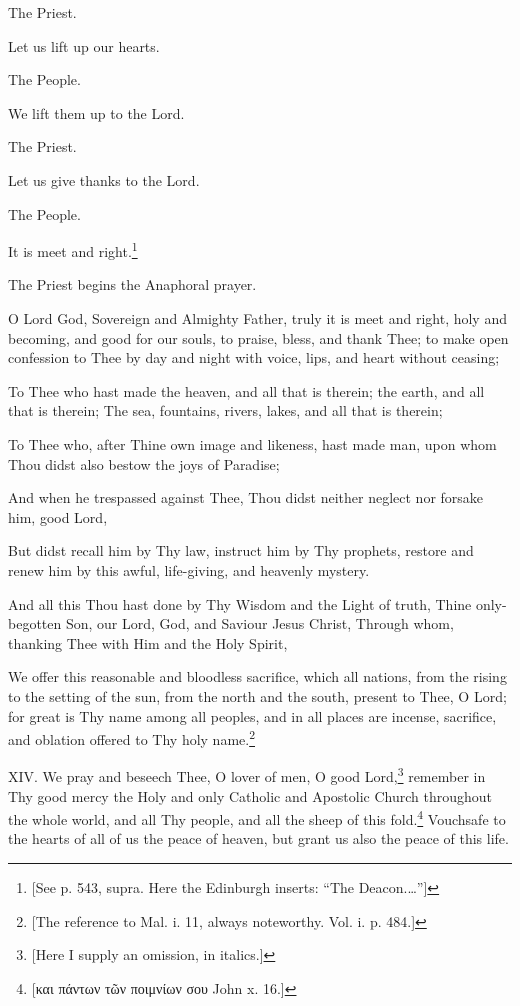 The Priest.

Let us lift up our hearts.

The People.

We lift them up to the Lord.

The Priest.

Let us give thanks to the Lord.

The People.

It is meet and right.\footnote{\par{}  [See p. 543, supra. Here the Edinburgh inserts: “The Deacon.…”]}

The Priest begins the Anaphoral prayer.

O Lord God, Sovereign and Almighty Father, truly it is meet and right, holy and becoming, and good for our souls, to praise, bless, and thank Thee; to make open confession to Thee by day and night with voice, lips, and heart without ceasing;

To Thee who hast made the heaven, and all that is therein; the earth, and all that is therein; The sea, fountains, rivers, lakes, and all that is therein;

To Thee who, after Thine own image and likeness, hast made man, upon whom Thou didst also bestow the joys of Paradise;

And when he trespassed against Thee, Thou didst neither neglect nor forsake him, good Lord,

But didst recall him by Thy law, instruct him by Thy prophets, restore and renew him by this awful, life-giving, and heavenly mystery.

And all this Thou hast done by Thy Wisdom and the Light of truth, Thine only-begotten Son, our Lord, God, and Saviour Jesus Christ, Through whom, thanking Thee with Him and the Holy Spirit,

We offer this reasonable and bloodless sacrifice, which all nations, from the rising to the setting of the sun, from the north and the south, present to Thee, O Lord; for great is Thy name among all peoples, and in all places are incense, sacrifice, and oblation offered to Thy holy name.\footnote{\par{}  [The reference to Mal. i. 11, always noteworthy. Vol. i. p. 484.]}

XIV. We pray and beseech Thee, O lover of men, O good Lord,\footnote{\par{}  [Here I supply an omission, in italics.]} remember in Thy good mercy the Holy and only Catholic and Apostolic Church throughout the whole world, and all Thy people, and all the sheep of this fold.\footnote{\par \textgreek{ [και πάντων τῶν ποιμνίων σου} John x. 16.]} Vouchsafe to the hearts of all of us the peace of heaven, but grant us also the peace of this life.

